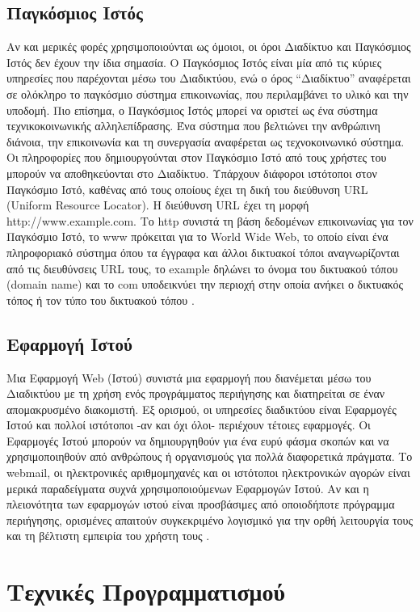 \subsection{Παγκόσμιος Ιστός}
Αν και μερικές φορές χρησιμοποιούνται ως όμοιοι, οι όροι Διαδίκτυο και Παγκόσμιος Ιστός δεν έχουν την ίδια σημασία. Ο Παγκόσμιος Ιστός είναι μία από τις κύριες υπηρεσίες που παρέχονται μέσω του Διαδικτύου, ενώ ο όρος ``Διαδίκτυο'' αναφέρεται σε ολόκληρο το παγκόσμιο σύστημα επικοινωνίας, που περιλαμβάνει το υλικό και την υποδομή. Πιο επίσημα, ο Παγκόσμιος Ιστός μπορεί να οριστεί ως ένα σύστημα τεχνικοκοινωνικής αλληλεπίδρασης. Ένα σύστημα που βελτιώνει την ανθρώπινη διάνοια, την επικοινωνία και τη συνεργασία αναφέρεται ως τεχνοκοινωνικό σύστημα. Οι πληροφορίες που δημιουργούνται στον Παγκόσμιο Ιστό από τους χρήστες του μπορούν να αποθηκεύονται στο Διαδίκτυο. Υπάρχουν διάφοροι ιστότοποι στον Παγκόσμιο Ιστό, καθένας από τους οποίους έχει τη δική του διεύθυνση URL (Uniform Resource Locator). Η διεύθυνση URL έχει τη μορφή http://www.example.com. Το http συνιστά τη βάση δεδομένων επικοινωνίας για τον Παγκόσμιο Ιστό, το www πρόκειται για το World Wide Web, το οποίο είναι ένα πληροφοριακό σύστημα όπου τα έγγραφα και άλλοι δικτυακοί τόποι αναγνωρίζονται από τις διευθύνσεις URL τους, το example δηλώνει το όνομα του δικτυακού τόπου (domain name) και το com υποδεικνύει την περιοχή στην οποία ανήκει ο δικτυακός τόπος ή τον τύπο του δικτυακού τόπου \cite{aghaei2012evolution}.

\subsection{Εφαρμογή Ιστού}
Μια Εφαρμογή Web (Ιστού) συνιστά μια εφαρμογή που διανέμεται μέσω του Διαδικτύου με τη χρήση ενός προγράμματος περιήγησης και διατηρείται σε έναν απομακρυσμένο διακομιστή. Εξ ορισμού, οι υπηρεσίες διαδικτύου είναι Εφαρμογές Ιστού και πολλοί ιστότοποι -αν και όχι όλοι- περιέχουν τέτοιες εφαρμογές. Οι Εφαρμογές Ιστού μπορούν να δημιουργηθούν για ένα ευρύ φάσμα σκοπών και να χρησιμοποιηθούν από ανθρώπους ή οργανισμούς για πολλά διαφορετικά πράγματα. Το webmail, οι ηλεκτρονικές αριθμομηχανές και οι ιστότοποι ηλεκτρονικών αγορών είναι μερικά παραδείγματα συχνά χρησιμοποιούμενων Εφαρμογών Ιστού. Αν και η πλειονότητα των εφαρμογών ιστού είναι προσβάσιμες από οποιοδήποτε πρόγραμμα περιήγησης, ορισμένες απαιτούν συγκεκριμένο λογισμικό για την ορθή λειτουργία τους και τη βέλτιστη εμπειρία του χρήστη τους \cite{Web_Apps}.

\section{Τεχνικές Προγραμματισμού}

